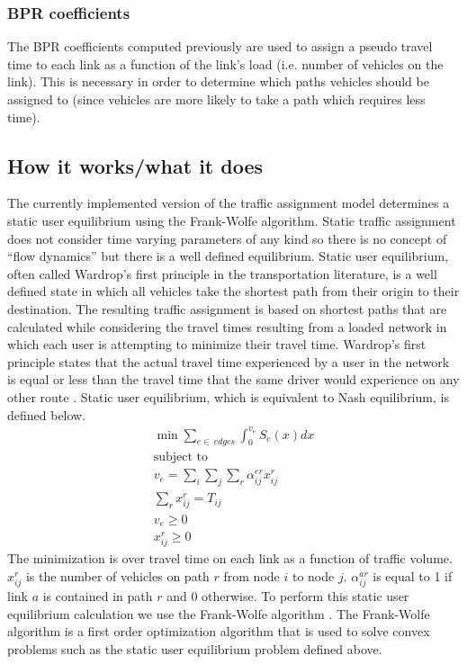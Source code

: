 \subsubsection{BPR coefficients}
The BPR coefficients computed previously are used to assign a pseudo travel time to each link as a function of the link's load (i.e. number of vehicles on the link). This is necessary in order to determine which paths vehicles should be assigned to (since vehicles are more likely to take a path which requires less time).


\subsection{How it works/what it does}
The currently implemented version of the traffic assignment model determines a static user equilibrium using the Frank-Wolfe algorithm. Static traffic assignment does not consider time varying parameters of any kind so there is no concept of \enquote{flow dynamics} but there is a well defined equilibrium. Static user equilibrium, often called Wardrop’s first principle in the transportation literature, is a well defined state in which all vehicles take the shortest path from their origin to their destination. The resulting traffic assignment is based on shortest paths that are calculated while considering the travel times resulting from a loaded network in which each user is attempting to minimize their travel time. 
Wardrop's first principle states that the actual travel time experienced by a user in the network is equal or less than the travel time that the same driver would experience on any other route . Static user equilibrium, which is equivalent to Nash equilibrium, is defined below.
\begin{equation}
\begin{split}
\min \sum_{e\in\ \textit{edges}}\int_{0}^{v_e} S_e(x) dx\\
\text{subject to} \\ 
v_e = \sum_i \sum_j \sum_r \alpha_{ij}^{er} x_{ij}^{r}\\
\sum_r x_{ij}^{r} = T_{ij}\\
v_e \geq 0 \\
x_{ij}^{r} \geq 0
\end{split}
\end{equation}
The minimization is over travel time on each link as a function of traffic volume. $x_{ij}^{r}$ is the number of vehicles on path $r$ from node $i$ to node $j$. $\alpha_{ij}^{ar}$ is equal to 1 if link $a$ is contained in path $r$ and 0 otherwise.  To perform this static user equilibrium calculation we use the Frank-Wolfe algorithm \cite{frank1956algorithm}. The Frank-Wolfe algorithm is a first order optimization algorithm that is used to solve convex problems such as the static user equilibrium problem defined above.


